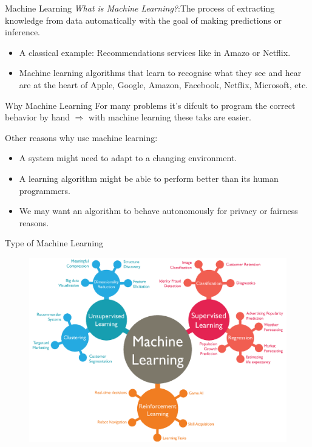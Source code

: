 \documentclass{bredelebeamer}
\begin{document}
\begin{frame}{Machine Learning}
\emph{What is Machine Learning?}:The process of extracting knowledge from data automatically with the goal of making predictions or inference.\\
\begin{itemize}
	\item A classical example: Recommendations services like in Amazo or Netflix.
	\item Machine learning algorithms that learn to recognise what they see and hear are at the heart of Apple, Google, Amazon, Facebook, Netflix, Microsoft, etc.
\end{itemize}
\end{frame}

\begin{frame}{Why Machine Learning}
For many problems  it’s difcult to program the correct behavior by hand  $\Rightarrow$ with machine learning these taks are easier.
\begin{exampleblock}{Other reasons why use machine learning:}
\begin{itemize}
	\item A system might need to adapt to a changing environment.
	\item A learning algorithm might be able to perform better than its human programmers.
	\item We may want an algorithm to behave autonomously for privacy or fairness reasons.
\end{itemize}
\end{exampleblock}

\end{frame}


\begin{frame}{Type of Machine Learning}
\begin{figure}[h]
\includegraphics[scale=0.75]{../image/ml_type4.png}
\end{figure}
\end{frame}
\end{document}
